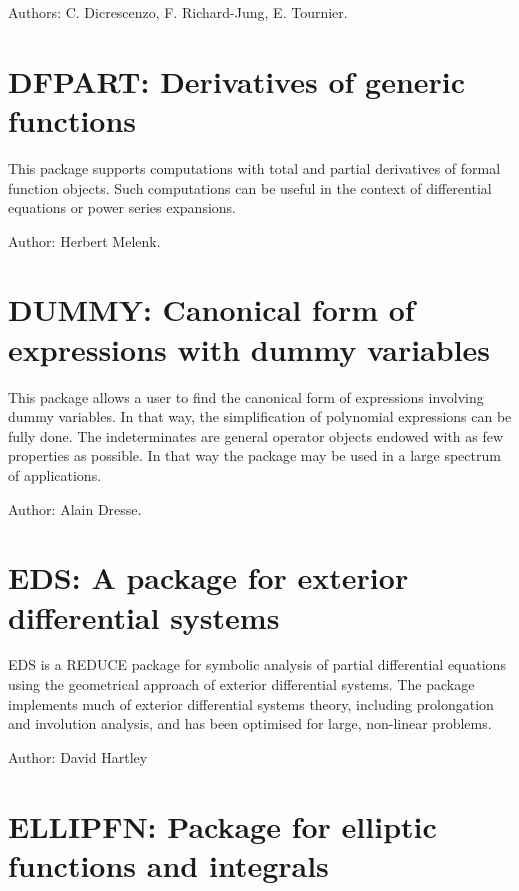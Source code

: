 Authors: C. Dicrescenzo, F. Richard-Jung, E. Tournier.



\newpage

\section{DFPART: Derivatives of generic functions}

This package supports computations with total and partial derivatives of
formal function objects.  Such computations can be useful in the context
of differential equations or power series expansions.

Author: Herbert Melenk.



\newpage

\section{DUMMY: Canonical form of expressions with dummy variables}

This package allows a user to find the canonical form of expressions
involving dummy variables. In that way, the simplification of
polynomial expressions can be fully done. The indeterminates are general
operator objects endowed with as few properties as possible. In that way
the package may be used in a large spectrum of applications.

Author: Alain Dresse.



\newpage

\section{EDS: A package for exterior differential systems}

EDS is a REDUCE package for symbolic analysis of partial differential
equations using the geometrical approach of exterior differential
systems. The package implements much of exterior differential systems
theory, including prolongation and involution analysis, and has been
optimised for large, non-linear problems.

Author: David Hartley



\newpage


\section{ELLIPFN: Package for elliptic functions and integrals}

